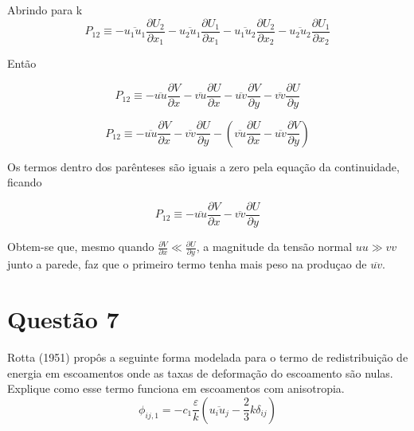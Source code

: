 \documentclass[12pt]{article}
\begin{document}
Abrindo para k
\begin{equation}
	P_{12} \equiv - \overline{u_1 u_1} \frac{\partial U_2}{\partial x_1}
	- \overline{u_2 u_1} \frac{\partial U_1}{\partial x_1} - \overline{u_1 u_2} \frac{\partial U_2}{\partial x_2}
	- \overline{u_2 u_2} \frac{\partial U_1}{\partial x_2}
\end{equation}

Então

\begin{equation}
	P_{12} \equiv - \overline{uu} \frac{\partial V}{\partial x}
	- \overline{vu} \frac{\partial U}{\partial x} - \overline{uv} \frac{\partial V}{\partial y}
	- \overline{vv} \frac{\partial U}{\partial y}
\end{equation}

\begin{equation}
	P_{12} \equiv - \overline{uu} \frac{\partial V}{\partial x}
	- \overline{vv} \frac{\partial U}{\partial y} - \left( \overline{vu} \frac{\partial U}{\partial x} - \overline{uv} \frac{\partial V}{\partial y}\right) 
\end{equation}

Os termos dentro dos parênteses são iguais a zero pela equação da continuidade, ficando

\begin{equation}
	P_{12} \equiv - \overline{uu} \frac{\partial V}{\partial x}
	- \overline{vv} \frac{\partial U}{\partial y}
\end{equation}

Obtem-se que, mesmo quando $\frac{\partial V}{\partial x}\ll \frac{\partial U}{\partial y}$, a magnitude da tensão normal $uu \gg vv$ junto a parede, faz que o primeiro termo tenha mais peso na produçao de $\overline{uv}$.

\section*{Questão 7}

Rotta (1951) propôs a seguinte forma modelada para o termo de redistribuição de energia em escoamentos onde as taxas de deformação do escoamento são nulas. Explique como esse termo funciona em escoamentos com anisotropia.\\

\begin{equation}
	\phi_{ij,1} = - c_1 \frac{\varepsilon}{k} \left( \overline{u_i u_j} - \frac{2}{3} k \delta_{ij} \right)
\end{equation}
\end{document}
